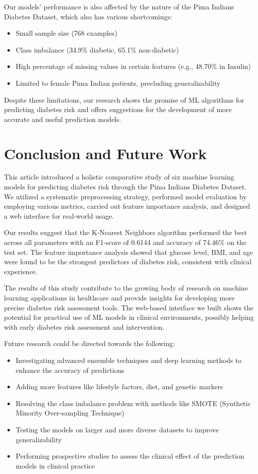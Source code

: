 \documentclass[conference]{IEEEtran}
\begin{document}
Our models' performance is also affected by the nature of the Pima Indians Diabetes Dataset, which also has various shortcomings:

\begin{itemize}
    \item Small sample size (768 examples)
    \item Class imbalance (34.9\% diabetic, 65.1\% non-diabetic)
    \item High percentage of missing values in certain features (e.g., 48.70\% in Insulin)
\item Limited to female Pima Indian patients, precluding generalizability
\end{itemize}

Despite these limitations, our research shows the promise of ML algorithms for predicting diabetes risk and offers suggestions for the development of more accurate and useful prediction models.

\section{Conclusion and Future Work}
This article introduced a holistic comparative study of six machine learning models for predicting diabetes risk through the Pima Indians Diabetes Dataset. We utilized a systematic preprocessing strategy, performed model evaluation by employing various metrics, carried out feature importance analysis, and designed a web interface for real-world usage.

Our results suggest that the K-Nearest Neighbors algorithm performed the best across all parameters with an F1-score of 0.6144 and accuracy of 74.46\% on the test set. The feature importance analysis showed that glucose level, BMI, and age were found to be the strongest predictors of diabetes risk, consistent with clinical experience.

The results of this study contribute to the growing body of research on machine learning applications in healthcare and provide insights for developing more precise diabetes risk assessment tools. The web-based interface we built shows the potential for practical use of ML models in clinical environments, possibly helping with early diabetes risk assessment and intervention.

Future research could be directed towards the following:

\begin{itemize}
\item Investigating advanced ensemble techniques and deep learning methods to enhance the accuracy of predictions
    \item Adding more features like lifestyle factors, diet, and genetic markers
    \item Resolving the class imbalance problem with methods like SMOTE (Synthetic Minority Over-sampling Technique)
    \item Testing the models on larger and more diverse datasets to improve generalizability
\item Performing prospective studies to assess the clinical effect of the prediction models in clinical practice
\end{itemize}
\end{document}
